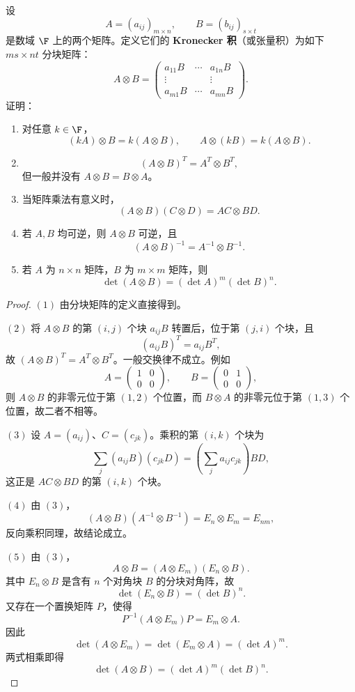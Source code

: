 \begin{problem}
设
	\[
	A=(a_{ij})_{m\times n},\qquad B=(b_{ij})_{s\times t}
	\]
	是数域 $\F$ 上的两个矩阵。定义它们的 \textbf{Kronecker 积}（或张量积）为如下 $ms\times nt$ 分块矩阵：
	\[
	A\otimes B=
	\begin{pmatrix}
		a_{11}B&\cdots&a_{1n}B\\
		\vdots&&\vdots\\
		a_{m1}B&\cdots&a_{mn}B
	\end{pmatrix}.
	\]
	证明：
	\begin{enumerate}
		\item 对任意 $k\in\F$，
		\[
		(kA)\otimes B=k(A\otimes B),
		\qquad
		A\otimes(kB)=k(A\otimes B).
		\]
		
		\item
		\[
		(A\otimes B)^T=A^T\otimes B^T,
		\]
		但一般并没有 $A\otimes B=B\otimes A$。
		
		\item 当矩阵乘法有意义时，
		\[
		(A\otimes B)(C\otimes D)=AC\otimes BD.
		\]
		
		\item 若 $A,B$ 均可逆，则 $A\otimes B$ 可逆，且
		\[
		(A\otimes B)^{-1}=A^{-1}\otimes B^{-1}.
		\]
		
		\item 若 $A$ 为 $n\times n$ 矩阵，$B$ 为 $m\times m$ 矩阵，则
		\[
		\det(A\otimes B)=(\det A)^m(\det B)^n.
		\]
	\end{enumerate}
\end{problem}

\begin{proof}
	$(1)$ 由分块矩阵的定义直接得到。
	
	$(2)$ 将 $A\otimes B$ 的第 $(i,j)$ 个块 $a_{ij}B$ 转置后，位于第 $(j,i)$ 个块，且
	\[
	(a_{ij}B)^T=a_{ij}B^T,
	\]
	故 $(A\otimes B)^T=A^T\otimes B^T$。一般交换律不成立。例如
	\[
	A=\begin{pmatrix}1&0\\0&0\end{pmatrix},
	\qquad
	B=\begin{pmatrix}0&1\\0&0\end{pmatrix},
	\]
	则 $A\otimes B$ 的非零元位于第 $(1,2)$ 个位置，而 $B\otimes A$ 的非零元位于第 $(1,3)$ 个位置，故二者不相等。
	
	$(3)$ 设 $A=(a_{ij})$、$C=(c_{jk})$。乘积的第 $(i,k)$ 个块为
	\[
	\sum_j(a_{ij}B)(c_{jk}D)
	=\left(\sum_j a_{ij}c_{jk}\right)BD,
	\]
	这正是 $AC\otimes BD$ 的第 $(i,k)$ 个块。
	
	$(4)$ 由 $(3)$，
	\[
	(A\otimes B)(A^{-1}\otimes B^{-1})
	=E_n\otimes E_m=E_{nm},
	\]
	反向乘积同理，故结论成立。
	
	$(5)$ 由 $(3)$，
	\[
	A\otimes B=(A\otimes E_m)(E_n\otimes B).
	\]
	其中 $E_n\otimes B$ 是含有 $n$ 个对角块 $B$ 的分块对角阵，故
	\[
	\det(E_n\otimes B)=(\det B)^n.
	\]
	又存在一个置换矩阵 $P$，使得
	\[
	P^{-1}(A\otimes E_m)P=E_m\otimes A.
	\]
	因此
	\[
	\det(A\otimes E_m)=\det(E_m\otimes A)=(\det A)^m.
	\]
	两式相乘即得
	\[
	\det(A\otimes B)=(\det A)^m(\det B)^n.
	\]
\end{proof}

